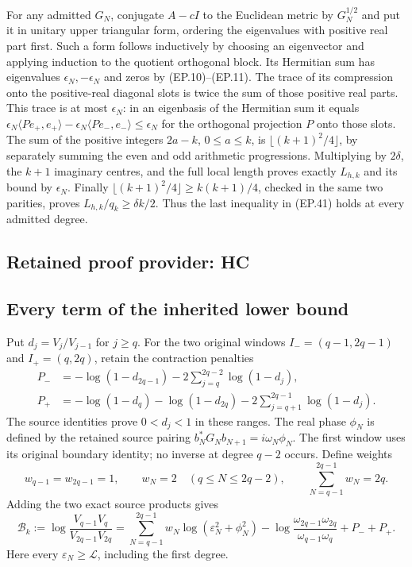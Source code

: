 \documentclass[11pt,a4paper]{article}
\begin{document}
For any admitted $G_N$, conjugate $A-cI$ to the Euclidean metric
by $G_N^{1/2}$ and put it in unitary upper triangular form, ordering
the eigenvalues with positive real part first. Such a form follows
inductively by choosing an eigenvector and applying induction to
the quotient orthogonal block. Its Hermitian sum has eigenvalues
$\epsilon_N,-\epsilon_N$ and zeros by (EP.10)--(EP.11).
The trace of its compression onto the positive-real diagonal slots
is twice the sum of those positive real parts. This trace is at
most $\epsilon_N$: in an eigenbasis of the Hermitian sum it equals
$\epsilon_N\langle P e_+,e_+\rangle
-\epsilon_N\langle P e_-,e_-\rangle\le\epsilon_N$ for the
orthogonal projection $P$ onto those slots.
The sum of the positive integers $2a-k$, $0\le a\le k$, is
$\lfloor(k+1)^2/4\rfloor$, by separately summing the even and odd
arithmetic progressions. Multiplying by $2\delta$, the $k+1$
imaginary centres, and the full local length proves exactly $L_{h,k}$
and its bound by $\epsilon_N$. Finally
$\lfloor(k+1)^2/4\rfloor\ge k(k+1)/4$, checked in the same two
parities, proves $L_{h,k}/q_k\ge\delta k/2$.
Thus the last inequality in (EP.41) holds at every admitted degree.

\clearpage
\subsection*{Retained proof provider: HC}

\subsection{Every term of the inherited lower bound}

Put $d_j=V_j/V_{j-1}$ for $j\geq q$.  For the two original windows
$I_-=(q-1,2q-1)$ and $I_+=(q,2q)$, retain the contraction penalties
\[
 \begin{split}
 P_-&=-\log(1-d_{2q-1})-2\sum_{j=q}^{2q-2}\log(1-d_j),\\
 P_+&=-\log(1-d_q)-\log(1-d_{2q})
       -2\sum_{j=q+1}^{2q-1}\log(1-d_j).
 \end{split}\tag{HC1}
\]
The source identities prove $0<d_j<1$ in these ranges.  The real phase
$\phi_N$ is defined by the retained source pairing
$b_N^*G_Nb_{N+1}=i\omega_N\phi_N$.  The first window uses its original
boundary identity; no inverse at degree $q-2$ occurs.  Define weights
\[
 w_{q-1}=w_{2q-1}=1,\qquad w_N=2\quad(q\leq N\leq2q-2),
 \qquad\sum_{N=q-1}^{2q-1}w_N=2q.
\]
Adding the two exact source products gives
\[
 \mathcal B_k:=\log\frac{V_{q-1}V_q}{V_{2q-1}V_{2q}}
 =\sum_{N=q-1}^{2q-1}w_N\log(\varepsilon_N^2+\phi_N^2)
 -\log\frac{\omega_{2q-1}\omega_{2q}}{\omega_{q-1}\omega_q}
 +P_-+P_+.
 \tag{HC2}
\]
Here every $\varepsilon_N\geq\mathcal L$, including the first degree.
\end{document}
